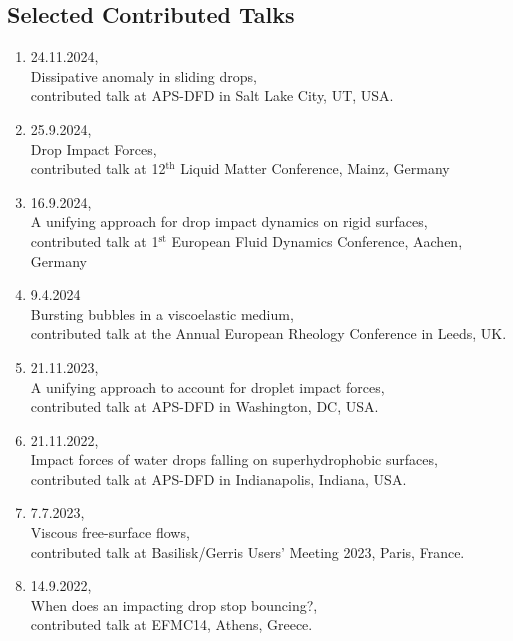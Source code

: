 \documentclass[10pt,a4paper,colorlinks,linkcolor=blue,urlcolor=blue,citecolor=blue]{moderncv}
\begin{document}
\subsection{\hspace*{-1.8cm}Selected Contributed Talks}

\begin{enumerate}[leftmargin=0.75cm]
	\item 24.11.2024,\\
	Dissipative anomaly in sliding drops,\\
	contributed talk at APS-DFD in Salt Lake City, UT, USA.

	\item 25.9.2024,\\
	Drop Impact Forces,\\
	contributed talk at 12$^\text{th}$ Liquid Matter Conference, Mainz, Germany

	\item 16.9.2024,\\
	A unifying approach for drop impact dynamics on rigid surfaces,\\
	contributed talk at 1$^\text{st}$ European Fluid Dynamics Conference, Aachen, Germany

	\item 9.4.2024\\
	Bursting bubbles in a viscoelastic medium,\\
	contributed talk at the Annual European Rheology Conference in Leeds, UK.

	\item 21.11.2023,\\
	A unifying approach to account for droplet impact forces,\\
	contributed talk at APS-DFD in Washington, DC, USA.

	\item 21.11.2022,\\
	Impact forces of water drops falling on superhydrophobic surfaces,\\
	contributed talk at APS-DFD in Indianapolis, Indiana, USA.

	\item 7.7.2023,\\
	Viscous free-surface flows,\\
	contributed talk at Basilisk/Gerris Users' Meeting 2023, Paris, France.

	\item 14.9.2022,\\
	When does an impacting drop stop bouncing?,\\
	contributed talk at EFMC14, Athens, Greece.


\end{enumerate}
\end{document}
